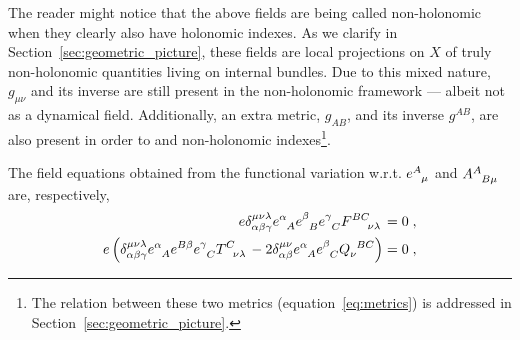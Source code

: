\documentclass[../../main.tex]{subfiles}
\begin{document}
The reader might notice that the above fields are being called non-holonomic when they clearly also have holonomic indexes. As we clarify in Section~\ref{sec:geometric_picture}, these fields are local projections on $X$ of truly non-holonomic quantities living on internal bundles. Due to this mixed nature, $g_{\mu\nu}$ and its inverse are still present in the non-holonomic framework --- albeit not as a dynamical field. Additionally, an extra metric, $g_{AB}$, and its inverse $g^{AB}$, are also present in order to  and  non-holonomic indexes\footnote{The relation between these two metrics (equation~\eqref{eq:metrics}) is addressed in Section~\ref{sec:geometric_picture}.}.

The field equations obtained from the functional variation w.r.t. $\tensor{e}{^A_\mu}$ and $\tensor{A}{^A_{B\mu}}$ are, respectively,
\begin{subequations}\label{eq:nonholonomic-field-eqs}
  \begin{align}
    e\delta^{\mu\nu\lambda}_{\alpha\beta\gamma}\tensor{e}{^\alpha_A}\tensor{e}{^\beta_B}\tensor{e}{^\gamma_C}\tensor{F}{^{BC}_{\nu\lambda}}                                                                                                          & = 0 \;, \label{eq:nonholonomic-einstein-like-field-eqs} \\
    e \left(\delta^{\mu\nu\lambda}_{\alpha\beta\gamma}\tensor{e}{^\alpha_A}\tensor{e}{^{B\beta}}\tensor{e}{^\gamma_C}\tensor{T}{^C_{\nu\lambda}}-2\delta^{\mu\nu}_{\alpha\beta}\tensor{e}{^\alpha_A}\tensor{e}{^\beta_C}\tensor{Q}{_\nu^{BC}}\right) & = 0 \;, \label{eq:nonholonomic-cartan-like-field-eqs}
  \end{align}
\end{subequations}
\end{document}
